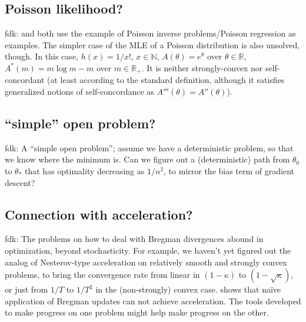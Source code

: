 \documentclass[twoside]{article}
\newcommand{\fdk}[1]{\textcolor{Periwinkle}{fdk:#1}}
\newcommand{\m}{m}
\begin{document}
\subsection{Poisson likelihood?}
\fdk{
\citet{bauschke2017descent} and \citet{hanzely2018fastest} both use the example of Poisson inverse problems/Poisson regression
as examples. 
The simpler case of the MLE of a Poisson distribution is also unsolved, though. 
In this case, $h(x) = 1/x!$, $x \in \mathbb{N}$, $A(\theta) = e^\theta$ over $\theta \in \mathbb{R}$,
$A^*(\m) = \m \log \m - \m$ over $\m \in \mathbb{R}_+$.
It is neither strongly-convex nor self-concordant (at least according to the standard definition, 
although it satisfies generalized notions of self-concordance as $A'''(\theta) = A''(\theta)$).
}

\subsection{``simple'' open problem?}
\fdk{
A ``simple open problem'';
assume we have a deterministic problem, so that we know where the minimum is. 
Can we figure out a (deterministic) path from $\theta_0$ to $\theta_*$ 
that has optimality decreasing as $1/n^2$, 
to mirror the bias term of gradient descent?
}

\subsection{Connection with acceleration?}
\fdk{
The problems on how to deal with Bregman divergences abound in optimization, beyond stochasticity. 
For example, we haven't yet figured out the analog of Nesterov-type acceleration 
on relatively smooth and strongly convex problems, 
to bring the convergence rate from linear in $(1-\kappa)$ to $(1-\sqrt{\kappa})$, 
or just from $1/T$ to $1/T^2$ in the (non-strongly) convex case.
\citet{dragomir2021optimal}  shows that naïve application of Bregman updates can not achieve acceleration.
The tools developed to make progress on one problem might help make progress on the other. 
}
\end{document}
